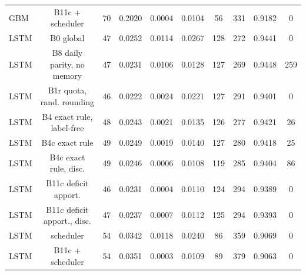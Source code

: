 \documentclass[10pt,onecolumn,letterpaper]{article}
\begin{document}
\begin{table}[!t]
{\begin{tabular}{lccccccccc}
GBM & B11c + scheduler & 70 & 0.2020 & 0.0004 & 0.0104 & 56 & 331 & 0.9182 & 0 \\
LSTM & B0 global & 47 & 0.0252 & 0.0114 & 0.0267 & 128 & 272 & 0.9441 & 0 \\
LSTM & B8 daily parity, no memory & 47 & 0.0231 & 0.0106 & 0.0128 & 127 & 269 & 0.9448 & 259 \\
LSTM & B1r quota, rand. rounding & 46 & 0.0222 & 0.0024 & 0.0221 & 127 & 291 & 0.9401 & 0 \\
LSTM & B4 exact rule, label-free & 48 & 0.0243 & 0.0021 & 0.0135 & 126 & 277 & 0.9421 & 26 \\
LSTM & B4c exact rule & 49 & 0.0249 & 0.0019 & 0.0140 & 127 & 280 & 0.9418 & 25 \\
LSTM & B4c exact rule, disc. & 49 & 0.0246 & 0.0006 & 0.0108 & 119 & 285 & 0.9404 & 86 \\
LSTM & B11c deficit apport. & 46 & 0.0231 & 0.0004 & 0.0110 & 124 & 294 & 0.9389 & 0 \\
LSTM & B11c deficit apport., disc. & 47 & 0.0237 & 0.0007 & 0.0112 & 125 & 294 & 0.9393 & 0 \\
LSTM & scheduler & 54 & 0.0342 & 0.0118 & 0.0240 & 86 & 359 & 0.9069 & 0 \\
LSTM & B11c + scheduler & 54 & 0.0351 & 0.0003 & 0.0109 & 89 & 379 & 0.9063 & 0 \\
\bottomrule
\end{tabular}}
\end{table}
\end{document}
